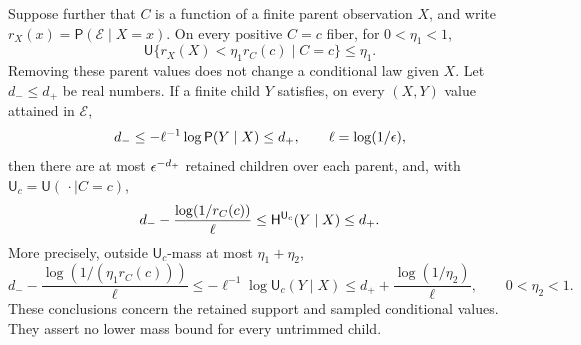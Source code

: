 \begin{lemma}
Suppose further that $C$ is a function of a finite parent observation
$X$, and write $r_X(x)=\mathsf P(\mathcal E\mid X=x)$.  On every
positive $C=c$ fiber, for $0<\eta_1<1$,
\begin{equation}
 \mathsf U\{r_X(X)<\eta_1r_C(c)\mid C=c\}\le\eta_1.
 \label{eq:nested-retention-fibers}
\end{equation}
Removing these parent values does not change a conditional law given
$X$.  Let $d_-\le d_+$ be real numbers.  If a finite child $Y$
satisfies, on every $(X,Y)$ value attained in $\mathcal E$,
\[
 d_-\le-\ell^{-1}\log\mathsf P(Y\mid X)\le d_+,
 \qquad \ell=\log(1/\epsilon),
\]
then there are at most $\epsilon^{-d_+}$ retained children over each
parent, and, with $\mathsf U_c=\mathsf U(\,\cdot\mid C=c)$,
\begin{equation}
 d_- -\frac{\log(1/r_C(c))}{\ell}
 \le \mathsf H^{\mathsf U_c}(Y\mid X)\le d_+.
 \label{eq:typical-cell-entropy}
\end{equation}
More precisely, outside $\mathsf U_c$-mass at most $\eta_1+\eta_2$,
\begin{equation}
 d_- -\frac{\log(1/(\eta_1r_C(c)))}{\ell}
 \le-\ell^{-1}\log\mathsf U_c(Y\mid X)
 \le d_+ +\frac{\log(1/\eta_2)}{\ell},
 \qquad 0<\eta_2<1.
 \label{eq:typical-cell-surprise}
\end{equation}
These conclusions concern the retained support and sampled
conditional values.  They assert no lower mass bound for every
untrimmed child.
\end{lemma}


